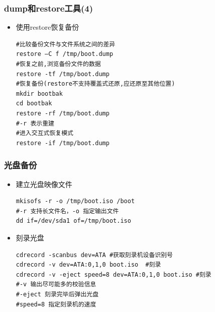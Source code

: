 \documentclass[xcolor=svgnames,presentation]{beamer}
\begin{document}
\begin{frame}[fragile]
\frametitle{dump和restore工具(4)}
\label{sec-7-9}
\begin{itemize}

\item 使用restore恢复备份\\
\label{sec-7-9-1}%
\begin{verbatim}
#比较备份文件与文件系统之间的差异
restore –C f /tmp/boot.dump
#恢复之前,浏览备份文件的数据
restore -tf /tmp/boot.dump
#恢复备份(restore不支持覆盖式还原,应还原至其他位置)
mkdir bootbak
cd bootbak
restore -rf /tmp/boot.dump
#-r 表示重建
#进入交互式恢复模式
restore -if /tmp/boot.dump
\end{verbatim}
\end{itemize} %
\end{frame}
\begin{frame}[fragile]
\frametitle{光盘备份}
\label{sec-7-10}
\begin{itemize}

\item 建立光盘映像文件\\
\label{sec-7-10-1}%
\begin{verbatim}
mkisofs -r -o /tmp/boot.iso /boot
#-r 支持长文件名，-o 指定输出文件
dd if=/dev/sda1 of=/tmp/boot.iso
\end{verbatim}

\item 刻录光盘\\
\label{sec-7-10-2}%
\begin{verbatim}
cdrecord -scanbus dev=ATA #获取刻录机设备识别号
cdrecord -v dev=ATA:0,1,0 boot.iso  #刻录
cdrecord -v -eject speed=8 dev=ATA:0,1,0 boot.iso #刻录
#-v 输出尽可能多的校验信息
#-eject 刻录完毕后弹出光盘
#speed=8 指定刻录机的速度
\end{verbatim}

\end{itemize} %
\end{frame}
\end{document}
